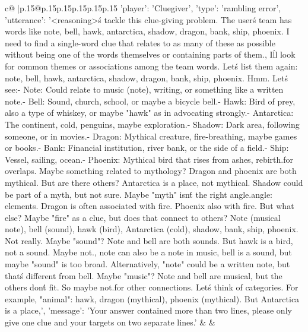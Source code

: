 \documentclass{article}
\begin{document}
{\begin{supertabular}{c@{$\;$}|p{.15\linewidth}@{}p{.15\linewidth}p{.15\linewidth}p{.15\linewidth}p{.15\linewidth}p{.15\linewidth}}
{{{                {'player': 'Cluegiver', 'type': 'rambling error', 'utterance': '<reasoning>\nLet\'s tackle this clue-giving problem. The user\'s team has words like note, bell, hawk, antarctica, shadow, dragon, bank, ship, phoenix. I need to find a single-word clue that relates to as many of these as possible without being one of the words themselves or containing parts of them.\n\nFirst, I\'ll look for common themes or associations among the team words. Let\'s list them again: note, bell, hawk, antarctica, shadow, dragon, bank, ship, phoenix. Hmm. Let\'s see:\n\n- Note: Could relate to music (note), writing, or something like a written note.\n- Bell: Sound, church, school, or maybe a bicycle bell.\n- Hawk: Bird of prey, also a type of whiskey, or maybe "hawk" as in advocating strongly.\n- Antarctica: The continent, cold, penguins, maybe exploration.\n- Shadow: Dark area, following someone, or in movies.\n- Dragon: Mythical creature, fire-breathing, maybe games or books.\n- Bank: Financial institution, river bank, or the side of a field.\n- Ship: Vessel, sailing, ocean.\n- Phoenix: Mythical bird that rises from ashes, rebirth.\n\nLooking for overlaps. Maybe something related to mythology? Dragon and phoenix are both mythical. But are there others? Antarctica is a place, not mythical. Shadow could be part of a myth, but not sure. Maybe "myth" isn\'t the right angle.\n\nAnother angle: elements. Dragon is often associated with fire. Phoenix also with fire. But what else? Maybe "fire" as a clue, but does that connect to others? Note (musical note), bell (sound), hawk (bird), Antarctica (cold), shadow, bank, ship, phoenix. Not really. Maybe "sound"? Note and bell are both sounds. But hawk is a bird, not a sound. Maybe not.\n\nWait, note can also be a note in music, bell is a sound, but maybe "sound" is too broad. Alternatively, "note" could be a written note, but that\'s different from bell. Maybe "music"? Note and bell are musical, but the others don\'t fit. So maybe not.\n\nLooking for other connections. Let\'s think of categories. For example, "animal": hawk, dragon (mythical), phoenix (mythical). But Antarctica is a place,', 'message': 'Your answer contained more than two lines, please only give one clue and your targets on two separate lines.'}
            }
        }
    }
    & & \\ \\

\end{supertabular}
}
\end{document}
